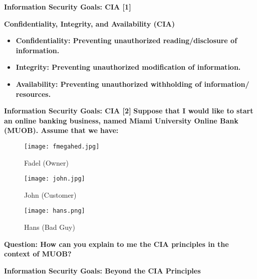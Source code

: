\documentclass[aspectratio=169]{beamer} %
\begin{document}
\begin{frame}{\textbf{Information Security Goals: CIA [1]}}
	\begin{block}{\textbf{Confidentiality, Integrity, and Availability (CIA)}}
		\begin{itemize}
			\item \textbf{\textcolor{miamired}{Confidentiality:} Preventing unauthorized reading/disclosure of information.}
			
			\item \textbf{\textcolor{miamired}{Integrity:} Preventing unauthorized modification of information.}
			
			\item \textbf{\textcolor{miamired}{Availability:} Preventing unauthorized withholding of information/ resources.}
		\end{itemize}
	\end{block}
\end{frame}

\begin{frame}{\textbf{Information Security Goals: CIA [2]}}
	\textbf{Suppose that I would like to start an online banking business, named Miami University Online Bank (MUOB). Assume that we have:}
	
	\begin{figure}[!htb] 
		\centering
		\texttt{[image: fmegahed.jpg]}
		\caption{Fadel (Owner)}\label{fig:fadel}
		\endminipage\hfill
		\centering
		\texttt{[image: john.jpg]}
		\caption{John (Customer)}\label{fig:john}
		\endminipage\hfill
		\centering
		\texttt{[image: hans.png]}
		\caption{Hans (Bad Guy)}\label{fig:hans}
		\endminipage
	\end{figure}
	
	\textbf{\textcolor{miamired}{Question: How can you explain to me the CIA principles in the context of MUOB?}}
\end{frame}

\begin{frame}{\textbf{Information Security Goals: Beyond the CIA Principles}}
	\centering 
	
\end{frame}
\end{document}
